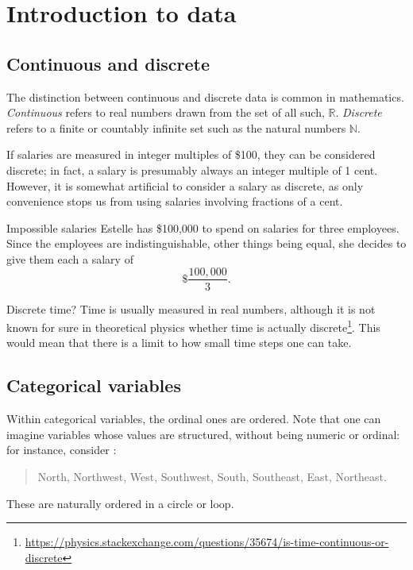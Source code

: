 \chapter{Introduction to data}
\label{introductionToData}

\section{Continuous and discrete}
The distinction between continuous and discrete data is common in mathematics. \emph{Continuous} refers to real numbers drawn from the set of all such, $\mathbb R$. \emph{Discrete} refers to a finite or countably infinite set such as the natural numbers $\mathbb N$.

If salaries are measured in integer multiples of \$100, they can be considered discrete; in fact, a salary is presumably always an integer multiple of 1 cent. However, it is somewhat artificial to consider a salary as discrete, as only convenience stops us from using salaries involving fractions of a cent.

\begin{example}{Impossible salaries}
	Estelle has \$100,000 to spend on salaries for three employees. Since the employees are indistinguishable, other things being equal, she decides to give them each a salary of
	\[
		\$\frac{100,000}3.
	\]
\end{example}

\begin{example}{Discrete time?}%
	Time is usually measured in real numbers, although it is not known for sure in theoretical physics whether
	time is actually discrete\footnote{\url{https://physics.stackexchange.com/questions/35674/is-time-continuous-or-discrete}}.
	This would mean that there is a limit to how small time steps one can take.
\end{example}

\section{Categorical variables}
Within categorical variables, the ordinal ones are ordered. Note that one can imagine variables whose values are structured, without being numeric or ordinal: for instance, consider :
\begin{quote}
	 North,
	 Northwest,
	 West,
	 Southwest,
	 South,
	 Southeast,
	 East,
	 Northeast.
\end{quote}
These are naturally ordered in a circle or loop.


